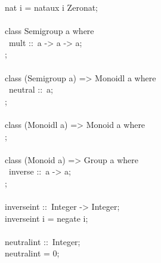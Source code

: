 \begin{isabellebody}
\begin{isamarkuptext}
\hspace*{0pt}nat i = nat{}aux i Zero{}nat;\\
\hspace*{0pt}\\
\hspace*{0pt}class Semigroup a where {}\\
\hspace*{0pt} ~mult ::~a -> a -> a;\\
\hspace*{0pt}{\char125};\\
\hspace*{0pt}\\
\hspace*{0pt}class (Semigroup a) => Monoidl a where {}\\
\hspace*{0pt} ~neutral ::~a;\\
\hspace*{0pt}{\char125};\\
\hspace*{0pt}\\
\hspace*{0pt}class (Monoidl a) => Monoid a where {}\\
\hspace*{0pt}{\char125};\\
\hspace*{0pt}\\
\hspace*{0pt}class (Monoid a) => Group a where {}\\
\hspace*{0pt} ~inverse ::~a -> a;\\
\hspace*{0pt}{\char125};\\
\hspace*{0pt}\\
\hspace*{0pt}inverse{}int ::~Integer -> Integer;\\
\hspace*{0pt}inverse{}int i = negate i;\\
\hspace*{0pt}\\
\hspace*{0pt}neutral{}int ::~Integer;\\
\hspace*{0pt}neutral{}int = 0;\\
\hspace*{0pt}\\

\end{isamarkuptext}
\end{isabellebody}
